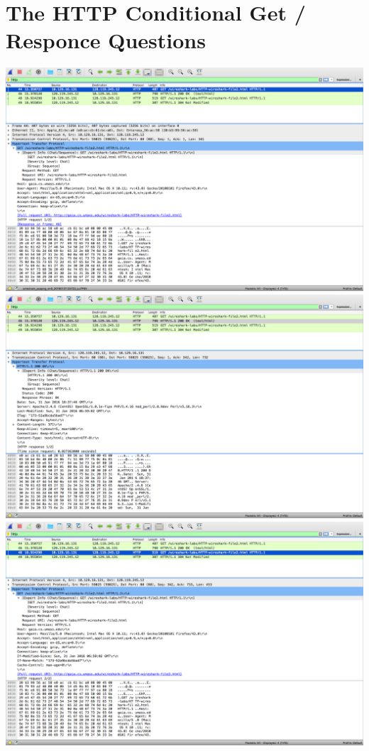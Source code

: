 \documentclass{article}
\begin{document}
\section {The HTTP Conditional Get / Responce Questions}
\includegraphics[width=\textwidth]{HTTPConditionalGet}\\
\includegraphics[width=\textwidth]{HTTPConditionalOk}\\
\includegraphics[width=\textwidth]{HTTPConditional2Get}\\
\end{document}
